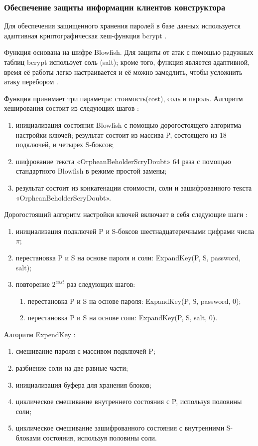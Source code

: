 
\subsubsection{Обеспечение защиты информации клиентов конструктора}

Для обеспечения защищенного хранения паролей в базе данных используется
адаптивная криптографическая хеш-функция bcrypt .

Функция основана на шифре Blowfish.
Для защиты от атак с помощью радужных таблиц bcrypt использует соль (salt);
кроме того, функция является адаптивной,
время её работы легко настраивается и её можно замедлить,
чтобы усложнить атаку перебором .

Функция принимает три параметра: стоимость(cost), соль и пароль.
Алгоритм хеширования состоит из следующих шагов :
\begin{enumerate}
	\item
	      инициализация состояния Blowfish с помощью дорогостоящего алгоритма настройки ключей;
	      результат состоит из массива P, состоящего из 18 подключей, и четырех S-боксов;
	\item шифрование текста «OrpheanBeholderScryDoubt» 64 раза с помощью стандартного
	      Blowfish в режиме простой замены;
	\item результат состоит из конкатенации стоимости, соли и зашифрованного текста
	      «OrpheanBeholderScryDoubt».

\end{enumerate}

Дорогостоящий алгоритм настройки ключей включает в себя следующие шаги
:
\begin{enumerate}
	\item инициализация подключей P и S-боксов шестнадцатеричными цифрами числа $\pi$;
	\item перестановка P и S на основе пароля и соли: ExpandKey(P, S, password, salt);
	\item повторение $2^{cost}$ раз следующих шагов:
	      \begin{enumerate}
		      \item перестановка P и S на основе пароля: ExpandKey(P, S, password, 0);
		      \item перестановка P и S на основе соли: ExpandKey(P, S, salt, 0).
	      \end{enumerate}
\end{enumerate}

Алгоритм ExpendKey
:
\begin{enumerate}
	\item смешивание пароля с массивом подключей P;
	\item
	      разбиение соли на две равные части;
	\item инициализация буфера для хранения блоков;
	\item циклическое смешивание внутреннего состояния с P, используя половины соли;
	\item циклическое смешивание зашифрованного состояния с внутренними S-блоками состояния,
	      используя половины соли.
\end{enumerate}

